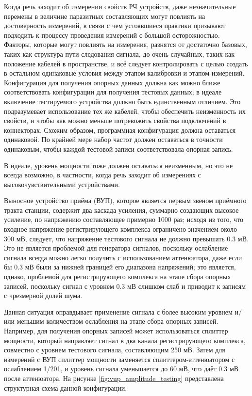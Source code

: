 \documentclass{report}
\begin{document}
Когда речь заходит об измерении свойств РЧ устройств, даже незначительные перемены в величине паразитных составляющих могут повлиять на достоверность измерений, в связи с чем устоявшиеся практики призывают подходить к процессу проведения измерений с большой осторожностью. Факторы, которые могут повлиять на измерения, разнятся от достаточно базовых, таких как структура пути следования сигнала, до очень случайных, таких как положение кабелей в пространстве, и всё следует контролировать с целью создать в остальном одинаковые условия между этапом калибровки и этапом измерений. Конфигурация для получения опорных данных должна как можно ближе соответствовать конфигурации для получения тестовых данных; в идеале включение тестируемого устройства должно быть единственным отличием. Это подразумевает использование тех же кабелей, чтобы обеспечить неизменность их свойств, и чтобы как можно меньше потревожить свойства подключений в коннекторах. Схожим образом, программная конфигурация должна оставаться одинаковой. По крайней мере набор частот должен оставаться в точности одинаковым, чтобы каждой тестовой записи соответствовала опорная запись.

В идеале, уровень мощности тоже должен оставаться неизменным, но это не всегда возможно, в частности, когда речь заходит об измерениях с высокочувствительными устройствами.

Выносное устройство приёма (ВУП), которое является первым звеном приёмного тракта станции, содержит два каскада усиления, суммарно создающих высокое усиление, по напряжению составляющее примерно 1000 раз; исходя из того, что входное напряжение регистрирующего комплекса ограничено значением около 300 мВ, следует, что напряжение тестового сигнала не должно превышать 0.3 мВ. Это не является проблемой для генератора сигналов, поскольку ослабление сигнала всегда можно легко получить с использованием аттенюатора, даже если бы 0.3 мВ были за нижней границей его диапазона напряжений; это является, однако, проблемой для регистрирующего комплекса на этапе сбора опорных записей, поскольку сигнал с уровнем 0.3 мВ слишком слаб и приводит к записям с чрезмерной долей шума.

Данная ситуация оправдывает применение сигнала с более высоким уровнем и/или меньшим количеством ослабления на этапе сбора опорных записей. Например, для получения опорных записей может использоваться сплиттер мощности, который направляет сигнал в два канала регистрирующего комплекса, совместно с уровнем тестового сигнала, составляющим 250 мВ. Затем для измерений с ВУП сплиттер мощности заменяется сплиттером-аттенюатором с ослаблением 1/201, и уровень сигнала уменьшается до 60 мВ, что даёт 0.3 мВ после аттенюатора. На рисунке \ref{fig:vup_amplitude_testing} представлена структурная схема данной конфигурации.
\end{document}
